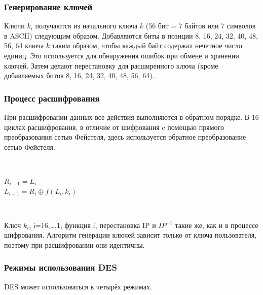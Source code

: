 \documentclass[a4paper]{report}
\begin{document}
\subsubsection{Генерирование ключей}
Ключи $k_{i}$ получаются из начального ключа $k$ (56 бит = 7 байтов или 7 символов в ASCII) следующим образом. Добавляются биты в позиции 8, 16, 24, 32, 40, 48, 56, 64 ключа $k$ таким образом, чтобы каждый байт содержал нечетное число единиц. Это используется для обнаружения ошибок при обмене и хранении ключей. Затем делают перестановку для расширенного ключа (кроме добавляемых битов 8, 16, 24, 32, 40, 48, 56, 64).

\subsubsection{Процесс расшифрования}
При расшифровании данных все действия выполняются в обратном порядке. В 16 циклах расшифрования, в отличие от шифрования c помощью прямого преобразования сетью Фейстеля, здесь используется обратное преобразование сетью Фейстеля.

~

$R_{i-1} = L_i$ \\
$L_{i-1} = R_i \oplus f(L_i,k_i)$

~

Ключ $k_{i}$, i=16,…,1, функция f, перестановка IP и $IP^{-1}$ такие же, как и в процессе шифрования. Алгоритм генерации ключей зависит только от ключа пользователя, поэтому при расшифровании они идентичны.


\subsubsection{Режимы использования DES}
DES может использоваться в четырёх режимах.
\end{document}
